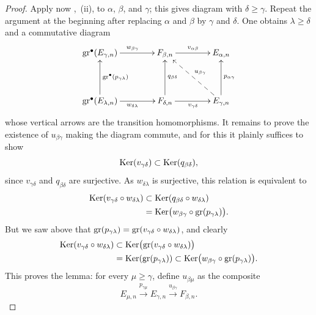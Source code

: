 \begin{proof}
Apply now ,~(ii), to $\alpha$, $\beta$, and $\gamma$;
this gives diagram  with $\delta\geq\gamma$.
Repeat the argument at the beginning after replacing $\alpha$ and $\beta$ by $\gamma$ and $\delta$.
One obtains $\lambda\geq\delta$ and a commutative diagram
\[
\xymatrix@C=4em@R=4em{
  \gr^\bullet(E_{\gamma,n})\ar[r]^{w_{\beta\gamma}} &
  F_{\beta,n}\ar[r]^{v_{\alpha\beta}} & E_{\alpha,n} \\
  \gr^\bullet(E_{\lambda,n})\ar[u]_{\gr^\bullet(p_{\gamma\lambda})}
    \ar[r]_{w_{\delta\lambda}} &
  F_{\delta,n}\ar[u]_{q_{\beta\delta}}\ar[r]_{v_{\gamma\delta}} &
  E_{\gamma,n}\ar[u]_{p_{\alpha\gamma}}
    \ar@{-->}[ul]_{u_{\beta\gamma}}
}
\]
whose vertical arrows are the transition homomorphisms.
It remains to prove the existence of $u_{\beta\gamma}$ making the diagram commute, and for this it plainly suffices to show
\[
  \operatorname{Ker}(v_{\gamma\delta})\subset\operatorname{Ker}(q_{\beta\delta}),
\]
since $v_{\gamma\delta}$ and $q_{\beta\delta}$ are surjective.
As $w_{\delta\lambda}$ is surjective, this relation is equivalent to
\[
\begin{split}
  \operatorname{Ker}(v_{\gamma\delta}\circ w_{\delta\lambda})
  &\subset\operatorname{Ker}(q_{\beta\delta}\circ w_{\delta\lambda})\\
  &=\operatorname{Ker}\bigl(w_{\beta\gamma}\circ\operatorname{gr}(p_{\gamma\lambda})\bigr).
\end{split}
\]
But we saw above that
$\operatorname{gr}(p_{\gamma\lambda})=\operatorname{gr}(v_{\gamma\delta}\circ w_{\delta\lambda})$, and clearly
\[
\begin{split}
  \operatorname{Ker}(v_{\gamma\delta}\circ w_{\delta\lambda})
  &\subset\operatorname{Ker}\bigl(\operatorname{gr}(v_{\gamma\delta}\circ w_{\delta\lambda})\bigr)\\
  &=\operatorname{Ker}(\operatorname{gr}(p_{\gamma\lambda}))
  \subset\operatorname{Ker}\bigl(w_{\beta\gamma}\circ\operatorname{gr}(p_{\gamma\lambda})\bigr).
\end{split}
\]
This proves the lemma: for every $\mu\geq\gamma$, define $u_{\beta\mu}$ as the composite
\[
  E_{\mu,n}\xrightarrow{p_{\gamma\mu}}E_{\gamma,n}
  \xrightarrow{u_{\beta\gamma}}F_{\beta,n}.
\]
\end{proof}

